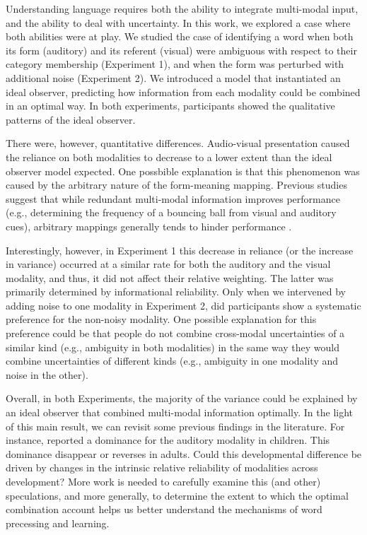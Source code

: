 \documentclass[10pt,letterpaper]{article}
\begin{document}
Understanding language requires both the ability to integrate multi-modal input, and the ability to deal with uncertainty. In this work, we explored a case where both abilities were at play. We studied the case of identifying a word when both its form (auditory) and its referent (visual) were ambiguous with respect to their category membership (Experiment 1), and when the form was perturbed with additional noise (Experiment 2). We introduced a model that instantiated an ideal observer, predicting how information from each modality could be combined in an optimal way. In both experiments, participants showed the qualitative patterns of the ideal observer.

There were, however, quantitative differences. Audio-visual presentation caused the reliance on both modalities to decrease to a lower extent than the ideal observer model expected. One possbible explanation is that this phenomenon was caused by the arbitrary nature of the form-meaning mapping. Previous studies suggest that while redundant multi-modal information improves performance (e.g., determining the frequency of a bouncing ball from visual and auditory cues), arbitrary mappings generally tends to hinder performance \cite<for review, see>{robinson2010}.

Interestingly, however, in Experiment 1 this decrease in reliance (or the increase in variance) occurred at a similar rate for both the auditory and the visual modality, and thus, it did not affect their relative weighting. The latter was primarily determined by informational reliability. Only when we intervened by adding  noise to one modality in Experiment 2, did participants show a systematic preference for the non-noisy modality. One possible explanation for this preference could be that people do not combine cross-modal uncertainties of a similar kind (e.g., ambiguity in both modalities) in the same way they would combine uncertainties of different kinds (e.g., ambiguity in one modality and noise in the other).

Overall, in both Experiments, the majority of the variance could be explained by an ideal observer that combined multi-modal information optimally. In the light of this main result, we can revisit some previous findings in the literature. For instance,  reported a dominance for the auditory modality in children. This dominance disappear or reverses in adults. Could this developmental difference be driven by changes in the intrinsic relative reliability of modalities across development? More work is needed to carefully examine this (and other) speculations, and more generally, to determine the extent to which the optimal combination account helps us better understand the mechanisms of word precessing and learning.



\setlength{\bibleftmargin}{.125in}
\setlength{\bibindent}{-\bibleftmargin}


\end{document}
